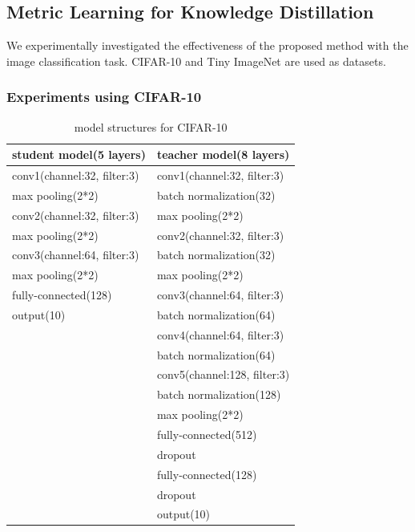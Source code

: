 \documentclass[a4paper,12pt]{article}
\begin{document}
\subsection{Metric Learning for Knowledge Distillation}
We experimentally investigated the effectiveness of the proposed method with the image classification task.
CIFAR-10 \cite{Krizhevsky2009} and Tiny ImageNet \cite{Le2015} are used as datasets.

\subsubsection{Experiments using CIFAR-10}

\begin{table}[ht] 
\caption{model structures for CIFAR-10}
\label{table:structure}
\begin{center}
\begin{tabular}{l|l} 
\hline
student model(5 layers) & teacher model(8 layers)   \\ \hline \hline
conv1(channel:32, filter:3) & conv1(channel:32, filter:3) \\
max pooling(2*2) & batch normalization(32) \\
conv2(channel:32, filter:3) & max pooling(2*2) \\
max pooling(2*2) & conv2(channel:32, filter:3) \\
conv3(channel:64, filter:3) & batch normalization(32) \\
max pooling(2*2) & max pooling(2*2) \\
fully-connected(128) & conv3(channel:64, filter:3) \\
output(10) & batch normalization(64) \\
 & conv4(channel:64, filter:3) \\
 & batch normalization(64) \\
 & conv5(channel:128, filter:3) \\
 &  batch normalization(128) \\
 & max pooling(2*2) \\
 & fully-connected(512) \\
 & dropout \\
 & fully-connected(128) \\
 & dropout \\
 & output(10) \\
\hline
\end{tabular}
\end{center}
\end{table}
\end{document}
